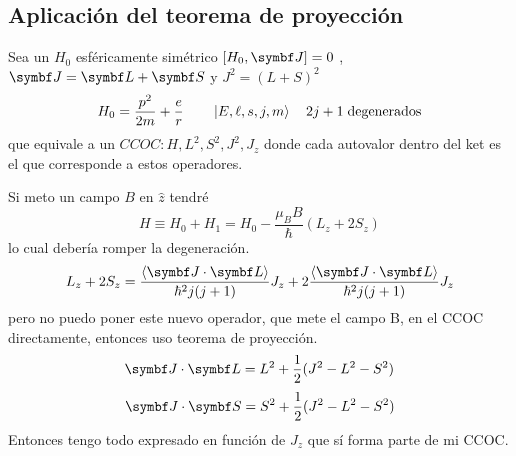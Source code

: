 \documentclass[10pt,oneside]{CBFT_book}
\begin{document}
\subsection{Aplicación del teorema de proyección}

Sea un $H_0$ esféricamente simétrico $[H_0,\vb{J}]=0$ , $\vb{J}=\vb{L}+\vb{S}$ y $J^2=(L+S)^2$
\[
	H_0 = \frac{p^2}{2m} + \frac{e}{r} \qquad \Ket{E,\ell,s,j,m} \quad 2j+1 \;\text{degenerados}
\]
que equivale a un $CCOC:H,L^2,S^2,J^2,J_z$ donde cada autovalor dentro del ket es el que corresponde a estos 
operadores.

Si meto un campo $B$ en $\hat{z}$ tendré 
\[
	H \equiv H_0 + H_1 = H_0 - \frac{\mu_B B}{\hbar}(L_z + 2S_z)
\]
lo cual debería romper la degeneración.
\[
	L_z + 2S_z = \frac{\Braket{\vb{J}\cdot\vb{L}}}{\hbar^2j(j+1)}J_z + 
		2\frac{\Braket{\vb{J}\cdot\vb{L}}}{\hbar^2j(j+1)}J_z
\]
pero no puedo poner este nuevo operador, que mete el campo B, en el CCOC directamente, entonces uso teorema 
de proyección.
\[
	\vb{J}\cdot\vb{L} = L^2 + \frac{1}{2}( J^2 - L^2 - S^2 )
\]
\[
	\vb{J}\cdot\vb{S} = S^2 + \frac{1}{2}( J^2 - L^2 - S^2 )
\]
Entonces tengo todo expresado en función de $J_z$ que sí forma parte de mi CCOC.


\end{document}
